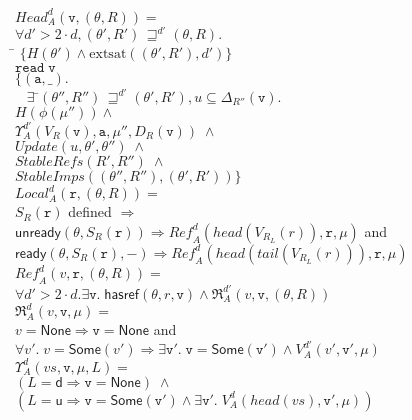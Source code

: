 \documentclass[preprint]{sigplanconf}
\newcommand{\betterstate}[3]{{#2}\, {\sqsupseteq}^{#1} {#3}}
\newcommand{\ready}[3]{\mathsf{ready}({#1}, {#2}, {#3})}
\newcommand{\unready}[2]{\mathsf{unready}({#1}, {#2})}
\newcommand{\hasref}[3]{\mathsf{hasref}({#1}, {#2}, {#3})}
\renewcommand{\implies}{\Rightarrow}
\newcommand{\term}[1]{\ensuremath{\mathtt{{#1}}}}
\newcommand{\Head}{\mathit{Head}}
\newcommand{\Local}{\mathit{Local}}
\newcommand{\Ref}{\mathit{Ref}}
\newcommand{\Update}{\mathit{Update}}
\newcommand{\StableRef}{\mathit{StableRefs}}
\newcommand{\StableImp}{\mathit{StableImps}}
\newcommand{\None}{\mathsf{None}}
\newcommand{\Some}[1]{\mathsf{Some}({#1})}
\newcommand{\U}{\mathsf{u}}
\newcommand{\D}{\mathsf{d}}
\newcommand{\head}[1]{\mathit{head}(#1)}
\newcommand{\tail}[1]{\mathit{tail}(#1)}
\newcommand{\satisfyext}[2]{\mathrm{extsat}({#1}, {#2})}
\begin{document}
\begin{figure}
\begin{tabbing}
$\Head^d_A(\term{v}, (\theta,R)) = $\\
\> $\forall d' > 2\cdot d, \betterstate{d'}{(\theta',R')}{(\theta,R)}.\;$ \\
\> \;\;\= $\{H(\theta') \land \satisfyext{(\theta',R')}{d'}\} $\\
\> \> \term{read\;v} \\
\> \> $\{(\term{a},\_).\;$\\ 
\> \> $\;\;\;\exists$ \=$\betterstate{d'}{(\theta'', R'')}{(\theta',R')}, u \subseteq \Delta_{R''}(\term{v}).$\\
\> \> \> $H(\phi(\mu'')) \land$ \\
\> \> \> $\Upsilon^{d'}_A(V_R(\term{v}), \term{a}, \mu'', D_{R}(\term{v})) \;\land$ \\
\> \> \> $\Update(u, \theta', \theta'') \;\land$ \\ 
\> \> \> $\StableRef(R', R'') \;\land$ \\
\> \> \> $\StableImp((\theta'',R''), (\theta',R'))\} $
\\[1em]

$\Local^d_A(\term{r}, (\theta, R)) = $ \\
\> $S_R(\term{r})$ defined $\implies$ \\
\> \> $\unready{\theta}{S_R(\term{r})} \implies \Ref^d_A(\head{V_R_L(r)}, \term{r}, \mu)$ and \\
\> \> $\ready{\theta}{S_R(\term{r})}{-} \implies \Ref^d_A(\head{\tail{V_R_L(r)}}, \term{r}, \mu)$ \\[1em]

$\Ref^d_A(v, \term{r}, (\theta,R)) = $ \\
\> $\forall d' > 2\cdot d. \exists \term{v}.\;\hasref{\theta}{r}{\term{v}} \land \Re^{d'}_A(v, \term{v}, (\theta,R))$ 
\\[1em]

$\Re^d_A(v, \term{v}, \mu) = $ \\
\> \> $v = \None \implies \term{v} = \None$ and \\
\> \> $\forall v'.\; v = \Some{v'} \implies \exists \term{v'}.\; \term{v} = \Some{\term{v'}} \land
       V^{d'}_A(v', \term{v'}, \mu)$  \\[1em]

$\Upsilon^d_A(vs, \term{v}, \mu, L) = $ \\
\> $(L = \D \implies \term{v = \None}) \;\land$ \\
\> $(L = \U \implies \term{v}=\Some{\term{v'}} \land \exists \term{v'}.\;V^{d}_A(\head{vs}, \term{v'}, \mu))$
\\[1em]


\end{tabbing}
\end{figure}
\end{document}
